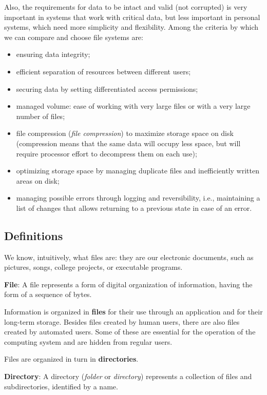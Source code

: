 Also, the requirements for data to be intact and valid (not corrupted) is very important in systems that work with critical data, but less important in personal systems, which need more simplicity and flexibility.
Among the criteria by which we can compare and choose file systems are:

\begin{itemize}
  \item ensuring data integrity;
  \item efficient separation of resources between different users;
  \item securing data by setting differentiated access permissions;
  \item managed volume: ease of working with very large files or with a very large number of files;
  \item file compression (\textit{file compression}) to maximize storage space on disk (compression means that the same data will occupy less space, but will require processor effort to decompress them on each use);
  \item optimizing storage space by managing duplicate files and inefficiently written areas on disk;
  \item managing possible errors through logging and reversibility, i.e., maintaining a list of changes that allows returning to a previous state in case of an error.
\end{itemize}

\subsection{Definitions}
\label{sec:data-files:defs}

We know, intuitively, what files are: they are our electronic documents, such as pictures, songs, college projects, or executable programs.

\textbf{File}: A file represents a form of digital organization of information, having the form of a sequence of bytes.

Information is organized in \textbf{files} for their use through an application and for their long-term storage.
Besides files created by human users, there are also files created by automated users.
Some of these are essential for the operation of the computing system and are hidden from regular users.

Files are organized in turn in \textbf{directories}.

\textbf{Directory}: A directory (\textit{folder} or \textit{directory}) represents a collection of files and subdirectories, identified by a name.

